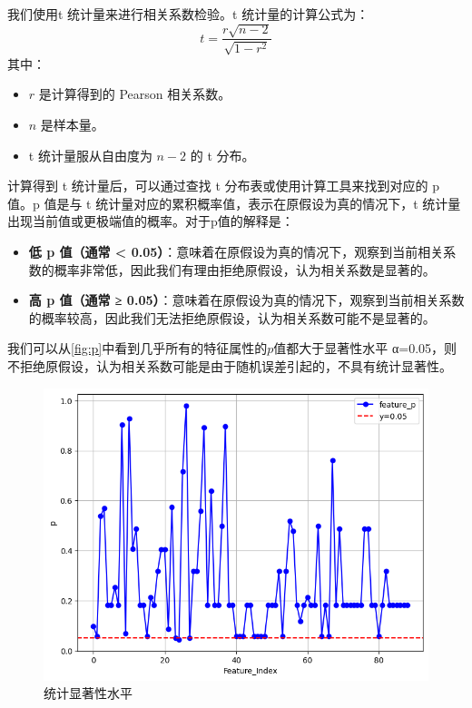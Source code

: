 我们使用t 统计量来进行相关系数检验。t 统计量的计算公式为：
\begin{equation}
t = \frac{r \sqrt{n - 2}}{\sqrt{1 - r^2}}
\label{eq:t}
\end{equation}
其中：
\begin{itemize}
    \item \(r\) 是计算得到的 Pearson 相关系数。
    \item \(n\) 是样本量。
    \item t 统计量服从自由度为 \(n - 2\) 的 t 分布。
\end{itemize}
计算得到 t 统计量后，可以通过查找 t 分布表或使用计算工具来找到对应的 p 值。p 值是与 t 统计量对应的累积概率值，表示在原假设为真的情况下，t 统计量出现当前值或更极端值的概率。对于p值的解释是：
\begin{itemize}
    \item \textbf{低 p 值（通常 < 0.05）}：意味着在原假设为真的情况下，观察到当前相关系数的概率非常低，因此我们有理由拒绝原假设，认为相关系数是显著的。
    \item \textbf{高 p 值（通常 ≥ 0.05）}：意味着在原假设为真的情况下，观察到当前相关系数的概率较高，因此我们无法拒绝原假设，认为相关系数可能不是显著的。
\end{itemize}
我们可以从\autoref{fig:p}中看到几乎所有的特征属性的$p$值都大于显著性水平 
α=0.05，则不拒绝原假设，认为相关系数可能是由于随机误差引起的，不具有统计显著性。
\begin{figure}[H]
    \centering
    \includegraphics[width=1\linewidth]{figures/p.png}
    \caption{统计显著性水平}
    \label{fig:p}
\end{figure}
 

